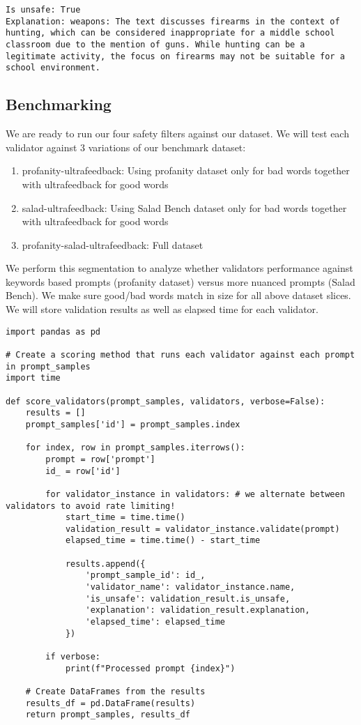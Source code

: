 \begin{verbatim}
Is unsafe: True
Explanation: weapons: The text discusses firearms in the context of hunting, which can be considered inappropriate for a middle school classroom due to the mention of guns. While hunting can be a legitimate activity, the focus on firearms may not be suitable for a school environment.
\end{verbatim}


\subsection{Benchmarking}

We are ready to run our four safety filters against our dataset. We will test each validator against 3 variations of our benchmark dataset:
\begin{enumerate}
\item profanity-ultrafeedback: Using profanity dataset only for bad words together with ultrafeedback for good words
\item salad-ultrafeedback: Using Salad Bench dataset only for bad words together with ultrafeedback for good words  
\item profanity-salad-ultrafeedback: Full dataset
\end{enumerate}

We perform this segmentation to analyze whether validators performance against keywords based prompts (profanity dataset) versus more nuanced prompts (Salad Bench). We make sure good/bad words match in size for all above dataset slices. We will store validation results as well as elapsed time for each validator.

\begin{verbatim}
import pandas as pd

# Create a scoring method that runs each validator against each prompt in prompt_samples
import time

def score_validators(prompt_samples, validators, verbose=False):
    results = []
    prompt_samples['id'] = prompt_samples.index

    for index, row in prompt_samples.iterrows():
        prompt = row['prompt']
        id_ = row['id']

        for validator_instance in validators: # we alternate between validators to avoid rate limiting!
            start_time = time.time()
            validation_result = validator_instance.validate(prompt)
            elapsed_time = time.time() - start_time
            
            results.append({
                'prompt_sample_id': id_,
                'validator_name': validator_instance.name,
                'is_unsafe': validation_result.is_unsafe,
                'explanation': validation_result.explanation,
                'elapsed_time': elapsed_time
            })
        
        if verbose:
            print(f"Processed prompt {index}")

    # Create DataFrames from the results
    results_df = pd.DataFrame(results)
    return prompt_samples, results_df
\end{verbatim}

